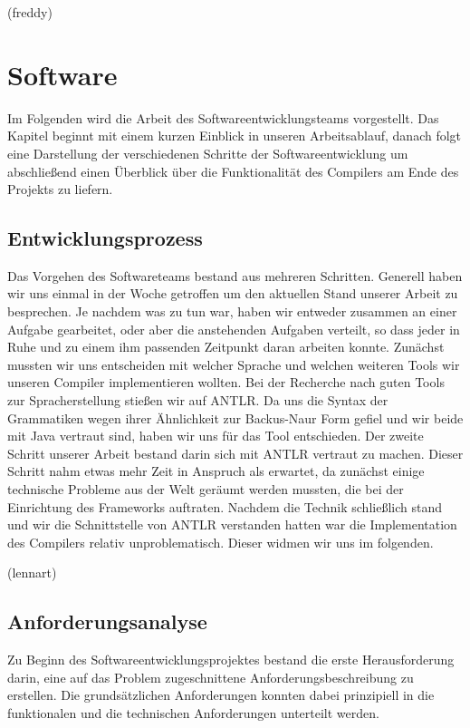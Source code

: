 \documentclass[paper=a4,fontsize=12pt,twocolumn]{scrreprt}
\begin{document}
(freddy)

\chapter{Software}
\label{ch:software}

Im Folgenden wird die Arbeit des Softwareentwicklungsteams vorgestellt. 
Das Kapitel beginnt mit einem kurzen Einblick in unseren Arbeitsablauf, danach folgt eine Darstellung der verschiedenen Schritte der Softwareentwicklung um abschließend einen Überblick über die Funktionalität des Compilers am Ende des Projekts zu liefern.

\section{Entwicklungsprozess}
\label{sec:entwicklungsprozess}

Das Vorgehen des Softwareteams bestand aus mehreren Schritten.
Generell haben wir uns einmal in der Woche getroffen um den aktuellen Stand unserer Arbeit zu besprechen.
Je nachdem was zu tun war, haben wir entweder zusammen an einer Aufgabe gearbeitet, oder aber die anstehenden Aufgaben verteilt, so dass jeder in Ruhe und zu einem ihm passenden Zeitpunkt daran arbeiten konnte.
Zunächst mussten wir uns entscheiden mit welcher Sprache und welchen weiteren Tools wir unseren Compiler implementieren wollten.
Bei der Recherche nach guten Tools zur Spracherstellung stießen wir auf ANTLR.
Da uns die Syntax der Grammatiken wegen ihrer Ähnlichkeit zur Backus-Naur Form gefiel und wir beide mit Java vertraut sind, haben wir uns für das Tool entschieden.
Der zweite Schritt unserer Arbeit bestand darin sich mit ANTLR vertraut zu machen.
Dieser Schritt nahm etwas mehr Zeit in Anspruch als erwartet, da zunächst einige technische Probleme aus der Welt geräumt werden mussten, die bei der Einrichtung des Frameworks auftraten.
Nachdem die Technik schließlich stand und wir die Schnittstelle von ANTLR verstanden hatten war die Implementation des Compilers relativ unproblematisch. Dieser widmen wir uns im folgenden.

(lennart)

\section{Anforderungsanalyse}
\label{sec:anforderungsanalyse}

Zu Beginn des Softwareentwicklungsprojektes bestand die erste Herausforderung darin, eine auf das Problem zugeschnittene Anforderungsbeschreibung zu erstellen.
Die grundsätzlichen Anforderungen konnten dabei prinzipiell in die funktionalen und die technischen Anforderungen unterteilt werden.
\end{document}
